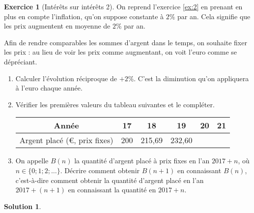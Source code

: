 \documentclass[12pt]{paper}
\theoremstyle{plain}
\newtheorem*{sol}{Solution}
\theoremstyle{definition}
\newtheorem{ex}{Exercice}
\newcommand{\exe}[2]{
		\begin{ex} #1  \end{ex}
		\begin{sol} #2 \end{sol}
	}
\newcommand{\exe}[2]{
		\begin{ex} #1  \end{ex}
	}
\begin{document}
 
 \exe{[Intérêts sur intérêts 2]
 
 	On reprend l'exercice \ref{ex:2} en prenant en plus en compte l'inflation, qu'on suppose constante à $2\%$ par an.
 	Cela signifie que les prix augmentent en moyenne de $2\%$ par an.
 	
 	Afin de rendre comparables les sommes d'argent dans le temps, on souhaite fixer les prix : au lieu de voir les prix comme augmentant, on voit l'euro comme se dépréciant.
 
	\begin{enumerate}
		\item Calculer l'évolution réciproque de $+2\%$. 
		C'est la diminution qu'on appliquera à l'euro chaque année.
		\item Vérifier les premières valeurs du tableau suivantes et le compléter.
			\begin{center}
			\begin{tabular}{|c|c|c|c|c|c|}\hline
				Année & 17 & 18 & 19 & 20 & 21 \\ \hline
				Argent placé (€, prix fixes) & 200 & 215,69 & 232,60 & &  \\ \hline
			\end{tabular}
			\end{center}
		\item On appelle $B(n)$ la quantité d'argent placé à prix fixes en l'an $2017+n$, où $n\in \{0 ; 1 ; 2; \dots \}$.
		Décrire comment obtenir $B(n+1)$ en connaissant $B(n)$, c'est-à-dire comment obtenir la quantité d'argent placé en l'an $2017+(n+1)$ en connaissant la quantité en $2017+n$.
	\end{enumerate}
 }{}
\end{document}
